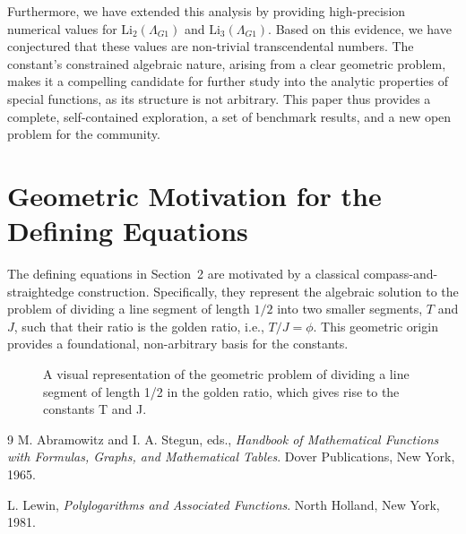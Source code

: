 \documentclass{amsart}
\theoremstyle{plain}
\theoremstyle{definition}
\theoremstyle{remark}
\newcommand{\LambdaG}{\Lambda_{G1}}
\begin{document}
Furthermore, we have extended this analysis by providing high-precision numerical values for $\mathrm{Li}_2(\LambdaG)$ and $\mathrm{Li}_3(\LambdaG)$. Based on this evidence, we have conjectured that these values are non-trivial transcendental numbers. The constant's constrained algebraic nature, arising from a clear geometric problem, makes it a compelling candidate for further study into the analytic properties of special functions, as its structure is not arbitrary. This paper thus provides a complete, self-contained exploration, a set of benchmark results, and a new open problem for the community.

\appendix
\section{Geometric Motivation for the Defining Equations}
\label{app:A}
The defining equations in Section~2 are motivated by a classical compass-and-straightedge construction. Specifically, they represent the algebraic solution to the problem of dividing a line segment of length $1/2$ into two smaller segments, $T$ and $J$, such that their ratio is the golden ratio, i.e., $T/J = \phi$. This geometric origin provides a foundational, non-arbitrary basis for the constants.

\begin{figure}[htbp]
    \centering
    \caption{A visual representation of the geometric problem of dividing a line segment of length 1/2 in the golden ratio, which gives rise to the constants T and J.}
    \label{fig:geometry}
\end{figure}

\begin{thebibliography}{9}
M. Abramowitz and I. A. Stegun, eds.,
\textit{Handbook of Mathematical Functions with Formulas, Graphs, and Mathematical Tables}.
Dover Publications, New York, 1965.

L. Lewin,
\textit{Polylogarithms and Associated Functions}.
North Holland, New York, 1981.

\end{thebibliography}
\end{document}
